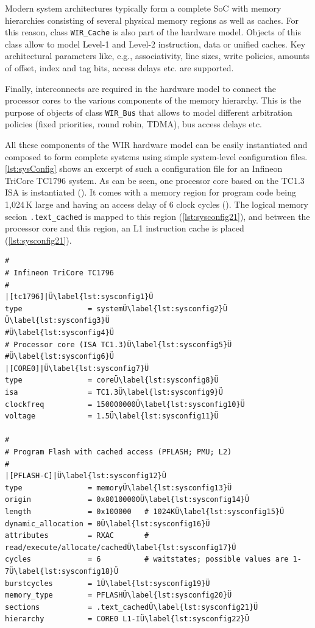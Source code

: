 Modern system architectures typically form a complete \gls{SoC} with memory hierarchies consisting of several physical memory regions as well as caches.
For this reason, class \texttt{WIR\_Cache} is also part of the hardware model.
Objects of this class allow to model Level-1 and Level-2 instruction, data or unified caches.
Key architectural parameters like, e.g., associativity, line sizes, write policies, amounts of offset, index and tag bits, access delays etc. are supported.

Finally, interconnects are required in the hardware model to connect the processor cores to the various components of the memory hierarchy.
This is the purpose of objects of class \texttt{WIR\_Bus} that allows to model different arbitration policies (fixed priorities, round robin, \gls{TDMA}), bus access delays etc.

All these components of the \gls{WIR} hardware model can be easily instantiated and composed to form complete systems using simple system-level configuration files.
\cref{lst:sysConfig} shows an excerpt of such a configuration file for an Infineon TriCore TC1796 system.
As can be seen, one processor core based on the TC1.3 \gls{ISA} is instantiated ().
It comes with a memory region for program code being 1,024\,K large and having an access delay of 6 clock cycles ().
The logical memory secion \texttt{.text\_cached} is mapped to this region (\cref{lst:sysconfig21}), and between the processor core and this region, an L1 instruction cache is placed (\cref{lst:sysconfig21}).

\begin{lstlisting}[style=commandline,float=t!,caption={Excerpt of a System Configuration File},label=lst:sysConfig]
#
# Infineon TriCore TC1796
#
|[tc1796]|Ü\label{lst:sysconfig1}Ü
type               = systemÜ\label{lst:sysconfig2}Ü
Ü\label{lst:sysconfig3}Ü
#Ü\label{lst:sysconfig4}Ü
# Processor core (ISA TC1.3)Ü\label{lst:sysconfig5}Ü
#Ü\label{lst:sysconfig6}Ü
|[CORE0]|Ü\label{lst:sysconfig7}Ü
type               = coreÜ\label{lst:sysconfig8}Ü
isa                = TC1.3Ü\label{lst:sysconfig9}Ü
clockfreq          = 150000000Ü\label{lst:sysconfig10}Ü
voltage            = 1.5Ü\label{lst:sysconfig11}Ü

#
# Program Flash with cached access (PFLASH; PMU; L2)
#
|[PFLASH-C]|Ü\label{lst:sysconfig12}Ü
type               = memoryÜ\label{lst:sysconfig13}Ü
origin             = 0x80100000Ü\label{lst:sysconfig14}Ü
length             = 0x100000   # 1024KÜ\label{lst:sysconfig15}Ü
dynamic_allocation = 0Ü\label{lst:sysconfig16}Ü
attributes         = RXAC       # read/execute/allocate/cachedÜ\label{lst:sysconfig17}Ü
cycles             = 6          # waitstates; possible values are 1-7Ü\label{lst:sysconfig18}Ü
burstcycles        = 1Ü\label{lst:sysconfig19}Ü
memory_type        = PFLASHÜ\label{lst:sysconfig20}Ü
sections           = .text_cachedÜ\label{lst:sysconfig21}Ü
hierarchy          = CORE0 L1-IÜ\label{lst:sysconfig22}Ü
\end{lstlisting}

